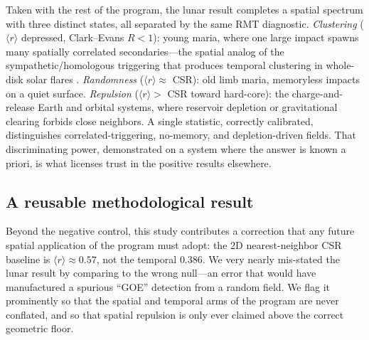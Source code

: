 \documentclass[12pt,a4paper]{article}
\begin{document}
Taken with the rest of the program, the lunar result completes a spatial spectrum with three distinct states, all separated by the same RMT diagnostic. \emph{Clustering} ($\langle r\rangle$ depressed, Clark--Evans $R<1$): young maria, where one large impact spawns many spatially correlated secondaries---the spatial analog of the sympathetic/homologous triggering that produces temporal clustering in whole-disk solar flares \citep{chen2026solar}. \emph{Randomness} ($\langle r\rangle\approx$ CSR): old limb maria, memoryless impacts on a quiet surface. \emph{Repulsion} ($\langle r\rangle>$ CSR toward hard-core): the charge-and-release Earth and orbital systems, where reservoir depletion or gravitational clearing forbids close neighbors. A single statistic, correctly calibrated, distinguishes correlated-triggering, no-memory, and depletion-driven fields. That discriminating power, demonstrated on a system where the answer is known a priori, is what licenses trust in the positive results elsewhere.

\subsection{A reusable methodological result}

Beyond the negative control, this study contributes a correction that any future spatial application of the program must adopt: the 2D nearest-neighbor CSR baseline is $\langle r\rangle\approx0.57$, not the temporal $0.386$. We very nearly mis-stated the lunar result by comparing to the wrong null---an error that would have manufactured a spurious ``GOE'' detection from a random field. We flag it prominently so that the spatial and temporal arms of the program are never conflated, and so that spatial repulsion is only ever claimed above the correct geometric floor.
\end{document}

